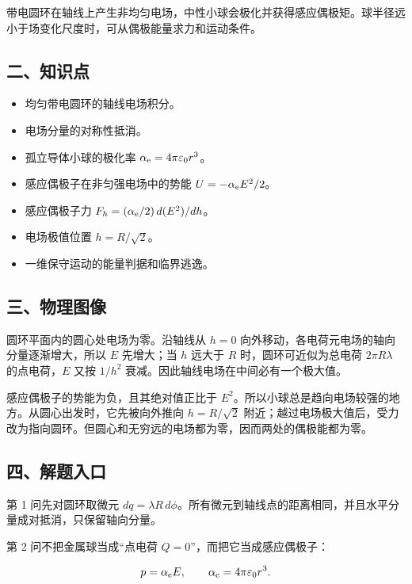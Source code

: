 \documentclass[12pt,a4paper,UTF8]{ctexart}
\newcommand{\tightlist}{\setlength{\itemsep}{0pt}\setlength{\parskip}{0pt}}
\begin{document}
带电圆环在轴线上产生非均匀电场，中性小球会极化并获得感应偶极矩。球半径远小于场变化尺度时，可从偶极能量求力和运动条件。

\subsection{二、知识点}\label{ux4e8cux77e5ux8bc6ux70b9-2}

\begin{itemize}
\tightlist
\item
  均匀带电圆环的轴线电场积分。
\item
  电场分量的对称性抵消。
\item
  孤立导体小球的极化率 \(\alpha_{\rm e}=4\pi\varepsilon_0r^3\)。
\item
  感应偶极子在非匀强电场中的势能 \(U=-\alpha_{\rm e}E^2/2\)。
\item
  感应偶极子力 \(F_h=(\alpha_{\rm e}/2)\,d(E^2)/dh\)。
\item
  电场极值位置 \(h=R/\sqrt2\)。
\item
  一维保守运动的能量判据和临界逃逸。
\end{itemize}

\subsection{三、物理图像}\label{ux4e09ux7269ux7406ux56feux50cf-2}

圆环平面内的圆心处电场为零。沿轴线从 \(h=0\)
向外移动，各电荷元电场的轴向分量逐渐增大，所以 \(E\) 先增大；当 \(h\)
远大于 \(R\) 时，圆环可近似为总电荷 \(2\pi R\lambda\) 的点电荷，\(E\)
又按 \(1/h^2\) 衰减。因此轴线电场在中间必有一个极大值。

感应偶极子的势能为负，且其绝对值正比于
\(E^2\)。所以小球总是趋向电场较强的地方。从圆心出发时，它先被向外推向
\(h=R/\sqrt2\)
附近；越过电场极大值后，受力改为指向圆环。但圆心和无穷远的电场都为零，因而两处的偶极能都为零。

\subsection{四、解题入口}\label{ux56dbux89e3ux9898ux5165ux53e3-2}

第 1 问先对圆环取微元
\(dq=\lambda R\,d\phi\)。所有微元到轴线点的距离相同，并且水平分量成对抵消，只保留轴向分量。

第 2 问不把金属球当成``点电荷 \(Q=0\)''，而把它当成感应偶极子：

\[p=\alpha_{\rm e}E,
\qquad
\alpha_{\rm e}=4\pi\varepsilon_0r^3.\]
\end{document}
